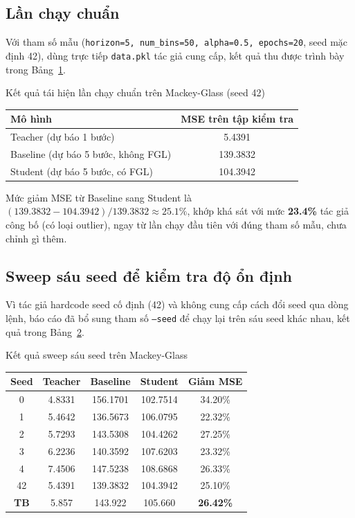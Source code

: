 \subsection{Lần chạy chuẩn}

Với tham số mẫu (\texttt{horizon=5, num\_bins=50, alpha=0.5, epochs=20}, seed mặc định 42),
dùng trực tiếp \texttt{data.pkl} tác giả cung cấp, kết quả thu được trình bày trong
Bảng~\ref{bang:mg-chuan}.

\begin{table}[H]{Kết quả tái hiện lần chạy chuẩn trên Mackey-Glass (seed 42)}
	\label{bang:mg-chuan}
	\centering
	\begin{tabular}{lc}
		\toprule
		\textbf{Mô hình} & \textbf{MSE trên tập kiểm tra} \\
		\midrule
		Teacher (dự báo 1 bước) & 5.4391 \\
		Baseline (dự báo 5 bước, không FGL) & 139.3832 \\
		Student (dự báo 5 bước, có FGL) & 104.3942 \\
		\bottomrule
	\end{tabular}
\end{table}

Mức giảm MSE từ Baseline sang Student là $(139.3832 - 104.3942)/139.3832 \approx 25.1\%$, khớp
khá sát với mức \textbf{23.4\%} tác giả công bố (có loại outlier), ngay từ lần chạy đầu tiên
với đúng tham số mẫu, chưa chỉnh gì thêm.

\subsection{Sweep sáu seed để kiểm tra độ ổn định}
\label{sec:mg-sweep-seed}

Vì tác giả hardcode seed cố định (42) và không cung cấp cách đổi seed qua dòng lệnh, báo cáo
đã bổ sung tham số \texttt{--seed} để chạy lại trên sáu seed khác nhau, kết quả trong
Bảng~\ref{bang:mg-sweep}.

\begin{table}[H]{Kết quả sweep sáu seed trên Mackey-Glass}
	\label{bang:mg-sweep}
	\centering
	\small
	\begin{tabular}{ccccc}
		\toprule
		\textbf{Seed} & \textbf{Teacher} & \textbf{Baseline} & \textbf{Student} & \textbf{Giảm MSE} \\
		\midrule
		0  & 4.8331 & 156.1701 & 102.7514 & 34.20\% \\
		1  & 5.4642 & 136.5673 & 106.0795 & 22.32\% \\
		2  & 5.7293 & 143.5308 & 104.4262 & 27.25\% \\
		3  & 6.2236 & 140.3592 & 107.6203 & 23.32\% \\
		4  & 7.4506 & 147.5238 & 108.6868 & 26.33\% \\
		42 & 5.4391 & 139.3832 & 104.3942 & 25.10\% \\
		\midrule
		\textbf{TB} & 5.857 & 143.922 & 105.660 & \textbf{26.42\%} \\
		\bottomrule
	\end{tabular}
\end{table}

